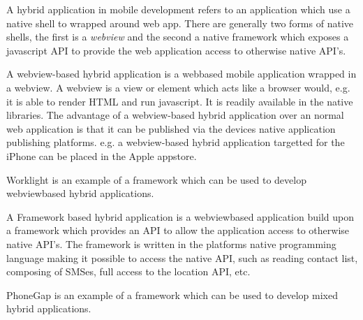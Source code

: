 
A hybrid application in mobile development refers to an application which use a native shell to wrapped around web app. There are generally two forms of native shells, the first is a \emph{webview} and the second a native framework which exposes a javascript API to provide the web application access to otherwise native API's.

A webview-based hybrid application is a webbased mobile application wrapped in a webview. A webview is a view or element which acts like a browser would, e.g. it is able to render HTML and run javascript.  It is readily available in the native libraries. The advantage of a webview-based hybrid application over an normal web application is that it can be published via the devices native application publishing platforms. e.g. a webview-based hybrid application targetted for the iPhone can be placed in the Apple appstore. 

Worklight is an example of a framework which can be used to develop webviewbased hybrid applications.

A Framework based hybrid application is a webviewbased application build upon a framework which provides an API to allow the application access to otherwise native API's. The framework is written in the platforms native programming language making it possible to access the native API, such as reading contact list, composing of SMSes, full access to the location API, etc.

PhoneGap is an example of a framework which can be used to develop mixed hybrid applications.